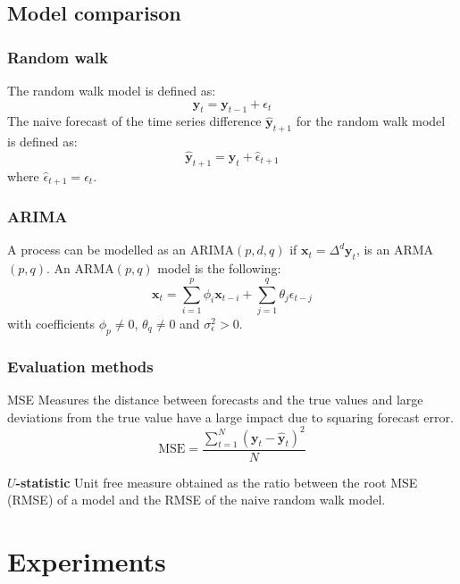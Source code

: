 \documentclass[compress,red]{beamer}
\begin{document}
\subsection{Model comparison} 
\begin{frame}
\frametitle{Random walk}
The random walk model is defined as:
\begin{equation}
\mathbf{y}_t = \mathbf{y}_{t-1} + \epsilon_{t}
\label{rwmodel}
\end{equation}
The naive forecast of the time series difference $\hat{\mathbf{y}}_{t+1}$ for the random walk model is defined as:
\begin{equation}
\hat{\mathbf{y}}_{t+1} = \mathbf{y}_t + \hat{\epsilon}_{t+1} 
\end{equation}
\noindent where  $\hat{\epsilon}_{t+1} = \epsilon_{t}$.
\end{frame}


\begin{frame}
\frametitle{ARIMA}
A process can be modelled as an ARIMA$(p,d,q)$ if $\mathbf{x}_t = \Delta^d \mathbf{y}_t $, is an ARMA$(p,q)$. An ARMA$(p,q)$ model is the following:
\begin{equation}
\mathbf{x}_t = \sum_{i=1}^p \phi_i \mathbf{x}_{t-i}  +  \sum_{j=1}^q \theta_j \epsilon_{t-j}  
\end{equation}
\noindent with coefficients $\phi_p \neq 0$, $\theta_q \neq 0$ and $\sigma_{\epsilon}^2 > 0$.
\end{frame}

\begin{frame}
\frametitle{Evaluation methods}
\begin{block}{MSE}
Measures the distance between forecasts
and the true values and large deviations from the true value have a
large impact due to squaring forecast error.
{\color{blue}
\begin{equation}\label{eq:MSE}
\text{MSE} = 
\frac{\displaystyle \sum_{t=1}^{N} (\mathbf{y}_t-\hat{\mathbf{y}}_t)^2}{N}
\end{equation}}
\end{block}
\begin{block}{\bf $U$-statistic}
Unit free measure obtained as the ratio between the root MSE (RMSE) of a model and the RMSE of the naive random walk model. 
\end{block}
\end{frame}

\section{Experiments}
\end{document}
